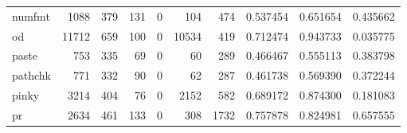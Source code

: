 \begin{tabular}{lrrrrrrrrr}
numfmt    &                                               1088 &                                                379 &                                                131 &                                                  0 &                                                104 &                                                474 &                                           0.537454 &                               0.651654 &                             0.435662 \\
od        &                                              11712 &                                                659 &                                                100 &                                                  0 &                                              10534 &                                                419 &                                           0.712474 &                               0.943733 &                             0.035775 \\
paste     &                                                753 &                                                335 &                                                 69 &                                                  0 &                                                 60 &                                                289 &                                           0.466467 &                               0.555113 &                             0.383798 \\
pathchk   &                                                771 &                                                332 &                                                 90 &                                                  0 &                                                 62 &                                                287 &                                           0.461738 &                               0.569390 &                             0.372244 \\
pinky     &                                               3214 &                                                404 &                                                 76 &                                                  0 &                                               2152 &                                                582 &                                           0.689172 &                               0.874300 &                             0.181083 \\
pr        &                                               2634 &                                                461 &                                                133 &                                                  0 &                                                308 &                                               1732 &                                           0.757878 &                               0.824981 &                             0.657555 \\

\end{tabular}
